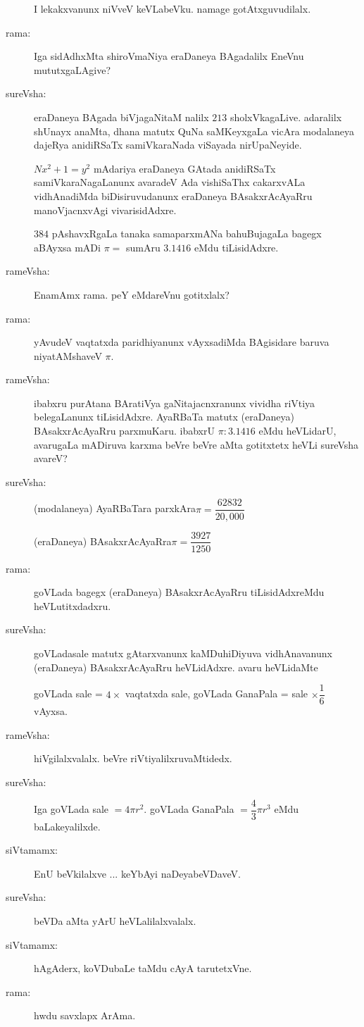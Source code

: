 \begin{description}
I lekakxvanunx niVveV keVLabeVku. namage gotAtxguvudilalx.

\item[rama:] Iga sidAdhxMta shiroVmaNiya eraDaneya BAgadalilx EneVnu mututxgaLAgive?

\item[sureVsha:] eraDaneya BAgada biVjagaNitaM nalilx $213$ sholxVkagaLive. adaralilx shUnayx anaMta, dhana matutx QuNa saMKeyxgaLa vicAra modalaneya dajeRya anidiRSaTx samiVkaraNada viSayada nirUpaNeyide.

$Nx^{2}+1=y^{2}$ mAdariya eraDaneya GAtada anidiRSaTx samiVkaraNagaLanunx avaradeV Ada vishiSaThx cakarxvALa vidhAnadiMda biDisiruvudanunx eraDaneya BAsakxrAcAyaRru manoVjacnxvAgi vivarisidAdxre.

$384$ pAshavxRgaLa tanaka samaparxmANa bahuBujagaLa bagegx aBAyxsa mADi $\pi=$ sumAru $3.1416$ eMdu tiLisidAdxre.

\item[rameVsha:] EnamAmx rama. peY eMdareVnu gotitxlalx?

\item[rama:] yAvudeV vaqtatxda paridhiyanunx vAyxsadiMda BAgisidare baruva niyatAMshaveV $\pi$.

\item[rameVsha:] ibabxru purAtana BAratiVya gaNitajacnxranunx vividha riVtiya belegaLanunx tiLisidAdxre. AyaRBaTa matutx (eraDaneya) BAsakxrAcAyaRru parxmuKaru. ibabxrU $\pi:3.1416$ eMdu heVLidarU, avarugaLa mADiruva karxma beVre beVre aMta gotitxtetx heVLi sureVsha avareV?

\item[sureVsha:] (modalaneya) AyaRBaTara parxkAra\quad $\pi=\dfrac{62832}{20,000}$

(eraDaneya) BAsakxrAcAyaRra\quad $\pi=\dfrac{3927}{1250}$

\item[rama:] goVLada bagegx (eraDaneya) BAsakxrAcAyaRru tiLisidAdxreMdu heVLutitxdadxru.

\item[sureVsha:] goVLadasale matutx gAtarxvanunx kaMDuhiDiyuva vidhAnavanunx (eraDaneya) BAsakxrAcAyaRru heVLidAdxre. avaru heVLidaMte 

goVLada sale = $4\times{}$ vaqtatxda sale, goVLada GanaPala = sale $\times\dfrac{1}{6}$ vAyxsa.

\item[rameVsha:] hiVgilalxvalalx. beVre riVtiyalilxruvaMtidedx.

\item[sureVsha:] Iga goVLada sale $=4\pi r^{2}$. goVLada GanaPala $=\dfrac{4}{3}\pi r^{3}$ eMdu baLakeyalilxde.

\item[siVtamamx:] EnU beVkilalxve ... keYbAyi naDeyabeVDaveV.

\item[sureVsha:] beVDa aMta yArU heVLalilalxvalalx.

\item[siVtamamx:] hAgAderx, koVDubaLe taMdu cAyA tarutetxVne.

\item[rama:] hwdu savxlapx ArAma.
\end{description}
